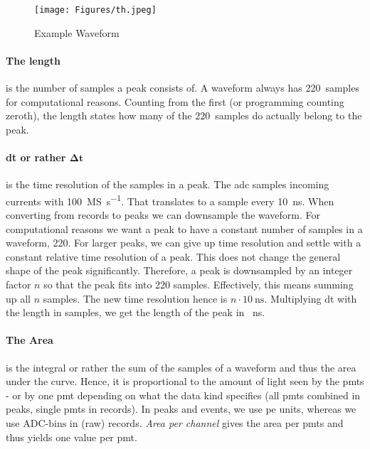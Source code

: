 \begin{figure}
\centering
\texttt{[image: Figures/th.jpeg]}  %
    \caption[Peak Waveform Example ]{
        Example Waveform
    }
\label{fig:waveform}
\end{figure}

\paragraph{The length} is the number of samples a peak consists of.
A waveform always has \SI{220}{samples} for computational reasons.
Counting from the first (or programming counting zeroth), the length states how many of the \SI{220}{samples} do actually belong to the peak.

\paragraph{dt or rather $ \mathbf{\Delta t}$} is the time resolution of the samples in a peak.
The \gls{adc} samples incoming currents with \SI{100}{\mega S\per\second}.
That translates to a sample every \SI{10}{\nano\second}.
When converting from records to peaks we can downsample the waveform.
For computational reasons we want a peak to have a constant number of samples in a waveform, 220.
For larger peaks, we can give up time resolution and settle with a constant relative time resolution of a peak.
This does not change the general shape of the peak significantly.
Therefore, a peak is downsampled by an integer factor $ n $ so that the peak fits into 220 samples.
Effectively, this means summing up all $ n $ samples.
The new time resolution hence is $ n \cdot \SI{10}{\nano\second} $.
Multiplying dt with the length in samples, we get the length of the peak in \SI{}{\nano\second}.

\paragraph{The Area} is the integral or rather the sum of the samples of a waveform and thus the area under the curve.
Hence, it is proportional to the amount of light seen by the \glspl{pmt} - or by one \gls{pmt} depending on what the data kind specifies (all \glspl{pmt} combined in peaks, single \glspl{pmt} in records).
In peaks and events, we use \gls{pe} units, whereas we use $ \mathrm{ADC\mbox{-}bins} $ in (raw) records.
\emph{Area per channel} gives the area per \glspl{pmt} and thus yields one value per \gls{pmt}.

